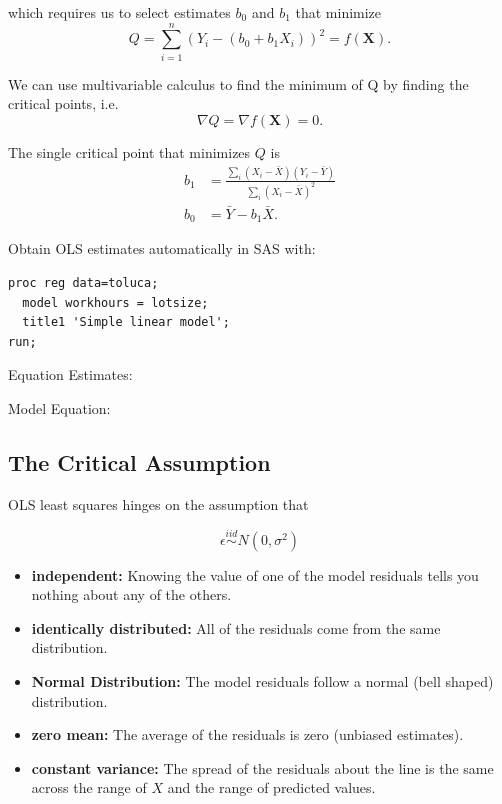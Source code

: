 \documentclass[12pt]{notes}
\begin{document}
which requires us to select estimates $b_0$ and $b_1$ that minimize
\[
Q = \sum_{i=1}^n\left(Y_i - \left(b_0 + b_1X_i \right) \right)^2 = f(\mathbf{X}).
\]

We can use multivariable calculus to find the minimum of Q by finding the critical points, i.e. 
\[\nabla Q = \nabla f(\mathbf{X}) = 0.\]

The single critical point that minimizes $Q$ is 
\begin{align*}
b_1 &= \frac{\sum_i (X_i - \bar{X})(Y_i - \bar{Y})}{\sum_i\left(X_i - \bar{X}\right)^2} \\
b_0 &= \bar{Y} - b_1\bar{X}.
\end{align*} 

Obtain OLS estimates automatically in SAS with:

\begin{verbatim}
proc reg data=toluca;
  model workhours = lotsize;
  title1 'Simple linear model';
run;
\end{verbatim}

\nspace
Equation Estimates:

\begin{minipage}[l][1cm][c]{\textwidth}

\end{minipage}

\nspace
Model Equation:

\begin{minipage}[l][1cm][c]{\textwidth}

\end{minipage}

\subsection*{The Critical Assumption}
OLS least squares hinges on the assumption that

\[\epsilon \stackrel{iid}{\sim} N(0, \sigma^2)\]

\begin{itemize}
\item \textbf{independent:} Knowing the value of one of the model residuals tells you nothing about any of the others. 
\item \textbf{identically distributed:} All of the residuals come from the same distribution.
\item \textbf{Normal Distribution:} The model residuals follow a normal (bell shaped) distribution. 
\item \textbf{zero mean:} The average of the residuals is zero (unbiased estimates). 
\item \textbf{constant variance:} The spread of the residuals about the line is the same across the range of $X$ and the range of predicted values. 
\end{itemize}
\end{document}
